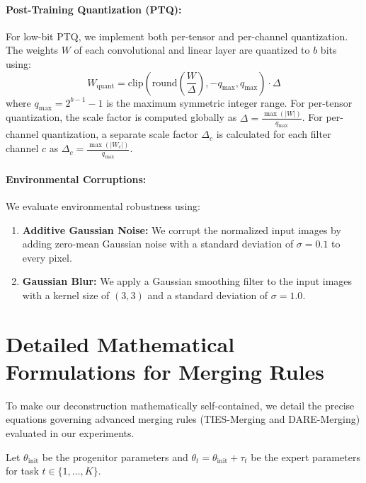 \documentclass{article}
\begin{document}
\paragraph{Post-Training Quantization (PTQ):}
For low-bit PTQ, we implement both per-tensor and per-channel quantization. The weights $W$ of each convolutional and linear layer are quantized to $b$ bits using:
\begin{equation}
    W_{\text{quant}} = \text{clip}\left(\text{round}\left(\frac{W}{\Delta}\right), -q_{\text{max}}, q_{\text{max}}\right) \cdot \Delta
\end{equation}
where $q_{\text{max}} = 2^{b-1} - 1$ is the maximum symmetric integer range. For per-tensor quantization, the scale factor is computed globally as $\Delta = \frac{\max(|W|)}{q_{\text{max}}}$. For per-channel quantization, a separate scale factor $\Delta_c$ is calculated for each filter channel $c$ as $\Delta_c = \frac{\max(|W_c|)}{q_{\text{max}}}$.

\paragraph{Environmental Corruptions:}
We evaluate environmental robustness using:
\begin{enumerate}
    \item \textbf{Additive Gaussian Noise:} We corrupt the normalized input images by adding zero-mean Gaussian noise with a standard deviation of $\sigma = 0.1$ to every pixel.
    \item \textbf{Gaussian Blur:} We apply a Gaussian smoothing filter to the input images with a kernel size of $(3,3)$ and a standard deviation of $\sigma = 1.0$.
\end{enumerate}

\section{Detailed Mathematical Formulations for Merging Rules}
\label{sec:appendix_math}
To make our deconstruction mathematically self-contained, we detail the precise equations governing advanced merging rules (TIES-Merging and DARE-Merging) evaluated in our experiments.

Let $\theta_{\text{init}}$ be the progenitor parameters and $\theta_t = \theta_{\text{init}} + \tau_t$ be the expert parameters for task $t \in \{1,\dots,K\}$.
\end{document}

